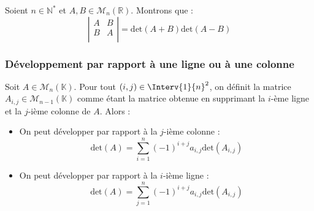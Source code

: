 \documentclass[a4paper,10pt]{report}
\begin{document}
\begin{Exemple} Soient $n \in \mathbb{N}^*$ et $A, B \in \mathcal{M}_n(\mathbb{R})$. Montrons que :
$$ \left\vert \begin{array}{cc}
A & B \\
B & A \\
\end{array}\right\vert= \textrm{det}(A+B) \textrm{det}(A-B)$$

\medskip

\vspace{8.5cm}
%
\end{Exemple}

\subsubsection{Développement par rapport à une ligne ou à une colonne}


\begin{Proposition}{} Soit $A \in \mathcal{M}_n(\mathbb{K})$. Pour tout $(i,j) \in  \Interv{1}{n}^2$, on définit la matrice $A_{i,j} \in  \mathcal{M}_{n-1}(\mathbb{K})$ comme étant la matrice obtenue en supprimant la $i$-ème ligne et la $j$-ième colonne de $A$. Alors :

\begin{itemize}
\item On peut développer par rapport à la $j$-ième colonne :
$$ \textrm{det}(A) = \sum_{i=1}^n (-1)^{i+j} a_{i,j} \textrm{det}(A_{i,j}) $$
\item On peut développer par rapport à la $i$-ième ligne :
$$ \textrm{det}(A) = \sum_{j=1}^n (-1)^{i+j} a_{i,j} \textrm{det}(A_{i,j}) $$
\end{itemize}
\end{Proposition}
\end{document}
